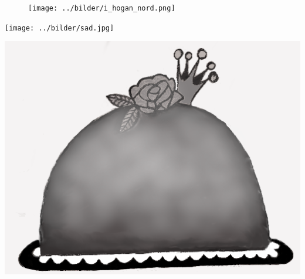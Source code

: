 %

\sclearpage
{}
\begin{figure}[!b]
\begin{center}
\texttt{[image: ../bilder/i\_hogan\_nord.png]} 
\end{center}
\end{figure}
\sclearpage

\sclearpage

\sclearpage

\sclearpage

\sclearpage

\begin{intersong}
	\begin{center}
		\texttt{[image: ../bilder/sad.jpg]} 
	\end{center}
\end{intersong}
\sclearpage

\sclearpage

\sclearpage

\sclearpage

\sclearpage

\sclearpage

\sclearpage

\sclearpage

\sclearpage

\begin{intersong}
\begin{center}
\includegraphics[width=1\textwidth]{../bilder/fardigabilder/CamillasFardigaBilder/Sverigesnationalsangprincesstarta.png} 
\end{center}
\end{intersong}
